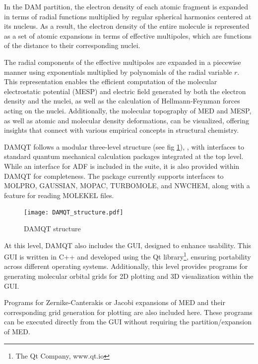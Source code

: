 \documentclass[10pt]{article}
\begin{document}
In the DAM partition, the electron density of each atomic fragment is expanded in terms of radial functions multiplied by regular spherical harmonics centered at its nucleus. As a result, the electron density of the entire molecule is represented as a set of atomic expansions in terms of effective multipoles, which are functions of the distance to their corresponding nuclei.

The radial components of the effective multipoles are expanded in a piecewise manner using exponentials multiplied by polynomials of the radial variable $r$. This representation enables the efficient computation of the molecular electrostatic potential (MESP) and electric field generated by both the electron density and the nuclei, as well as the calculation of Hellmann-Feynman forces acting on the nuclei. Additionally, the molecular topography of MED and MESP, as well as atomic and molecular density deformations, can be visualized, offering insights that connect with various empirical concepts in structural chemistry.

DAMQT follows a modular three-level structure (see fig \ref{fig:1}), , with interfaces to standard quantum mechanical calculation packages integrated at the top level. While an interface for ADF is included in the suite, it is also provided within DAMQT for completeness. The package currently supports interfaces to MOLPRO, GAUSSIAN, MOPAC, TURBOMOLE, and NWCHEM, along with a feature for reading MOLEKEL \mkl{ } files.

\begin{figure}[H]
\vspace*{-2cm}
\begin{center}
\texttt{[image: DAMQT\_structure.pdf]}
\end{center}
\vspace*{-2.5cm}
\caption{DAMQT structure \label{fig:1}}
\end{figure}

At this level, DAMQT also includes the GUI, designed to enhance usability.
This GUI is written in C++ and developed using the Qt library\footnote{The Qt Company, www.qt.io}, ensuring portability across different operating systems. Additionally, this level provides programs for generating molecular orbital grids for 2D plotting and 3D visualization within the GUI.

Programs for Zernike-Canterakis or Jacobi expansions of MED and their corresponding grid generation for plotting are also included here.
These programs can be executed directly from the GUI without requiring the partition/expansion of MED.
\end{document}
